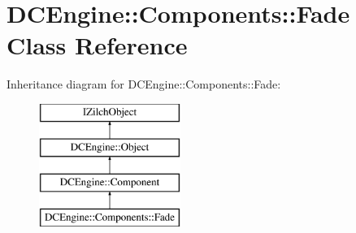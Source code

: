 \hypertarget{classDCEngine_1_1Components_1_1Fade}{\section{D\-C\-Engine\-:\-:Components\-:\-:Fade Class Reference}
\label{classDCEngine_1_1Components_1_1Fade}
}
Inheritance diagram for D\-C\-Engine\-:\-:Components\-:\-:Fade\-:\begin{figure}[H]
\begin{center}
\leavevmode
\includegraphics[height=4.000000cm]{classDCEngine_1_1Components_1_1Fade}
\end{center}
\end{figure}
